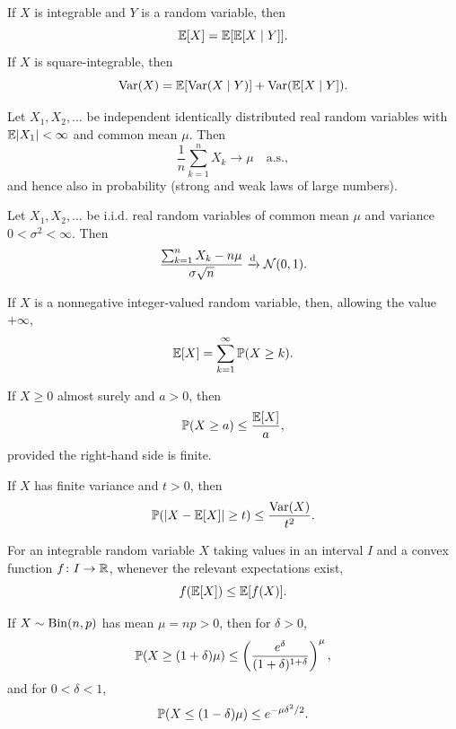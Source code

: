 \begin{theorem}
If $X$ is integrable and $Y$ is a random variable, then
\[
 \mathbb{E}[X]=\mathbb{E}[\mathbb{E}[X\mid Y]].
\]
If $X$ is square-integrable, then
\[
 \operatorname{Var}(X)=\mathbb{E}[\operatorname{Var}(X\mid Y)]
 +\operatorname{Var}(\mathbb{E}[X\mid Y]).
\]
\end{theorem}

\begin{theorem}
Let $X_1,X_2,\dots$ be independent identically distributed real random variables with $\mathbb{E}|X_1|<\infty$ and common mean $\mu$. Then
\[
 \frac1n\sum_{k=1}^n X_k\longrightarrow\mu\quad\text{a.s.},
\]
and hence also in probability (strong and weak laws of large numbers).
\end{theorem}

\begin{theorem}
Let $X_1,X_2,\dots$ be i.i.d. real random variables of common mean $\mu$ and variance $0<\sigma^2<\infty$. Then
\[
 \frac{\sum_{k=1}^n X_k-n\mu}{\sigma\sqrt n}
 \xrightarrow{\mathrm{d}}\mathcal{N}(0,1).
\]
\end{theorem}

\begin{theorem}
If $X$ is a nonnegative integer-valued random variable, then, allowing the value $+\infty$,
\[
 \mathbb{E}[X]=\sum_{k=1}^{\infty}\mathbb{P}(X\ge k).
\]
\end{theorem}

\begin{theorem}
If $X\ge0$ almost surely and $a>0$, then
\[
 \mathbb{P}(X\ge a)\le\frac{\mathbb{E}[X]}a,
\]
provided the right-hand side is finite.
\end{theorem}

\begin{theorem}
If $X$ has finite variance and $t>0$, then
\[
 \mathbb{P}\!\left(|X-\mathbb{E}[X]|\ge t\right)
 \le\frac{\operatorname{Var}(X)}{t^2}.
\]
\end{theorem}

\begin{theorem}
For an integrable random variable $X$ taking values in an interval $I$ and a convex function $f\colon I\to\mathbb{R}$, whenever the relevant expectations exist,
\[
 f(\mathbb{E}[X])\le\mathbb{E}[f(X)].
\]
\end{theorem}

\begin{theorem}
If $X\sim\operatorname{Bin}(n, p)$ has mean $\mu=np>0$, then for $\delta>0$,
\[
 \mathbb{P}(X\ge(1+\delta)\mu)
 \le\left(\frac{e^\delta}{(1+\delta)^{1+\delta}}\right)^\mu,
\]
and for $0<\delta<1$,
\[
 \mathbb{P}(X\le(1-\delta)\mu)\le e^{-\mu\delta^2/2}.
\]
\end{theorem}

